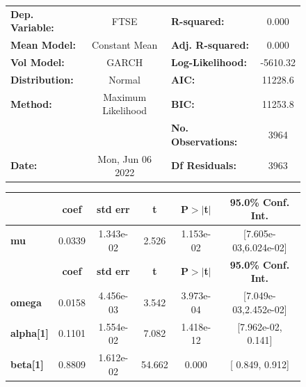 \documentclass[a4paper, oneside]{discothesis}
\begin{document}
\begin{figure}
\begin{multicols}{2}
{  
\begin{center}
\begin{tabular}{lclc}
\toprule
\textbf{Dep. Variable:} &        FTSE        & \textbf{  R-squared:         } &     0.000   \\
\textbf{Mean Model:}    &   Constant Mean    & \textbf{  Adj. R-squared:    } &     0.000   \\
\textbf{Vol Model:}     &       GARCH        & \textbf{  Log-Likelihood:    } &   -5610.32  \\
\textbf{Distribution:}  &       Normal       & \textbf{  AIC:               } &    11228.6  \\
\textbf{Method:}        & Maximum Likelihood & \textbf{  BIC:               } &    11253.8  \\
\textbf{}               &                    & \textbf{  No. Observations:  } &    3964     \\
\textbf{Date:}          &  Mon, Jun 06 2022  & \textbf{  Df Residuals:      } &    3963     \\
\bottomrule
\end{tabular}
\begin{tabular}{lccccc}
            & \textbf{coef} & \textbf{std err} & \textbf{t} & \textbf{P$> |$t$|$} & \textbf{95.0\% Conf. Int.}  \\
\midrule
\textbf{mu} &       0.0339  &    1.343e-02     &     2.526  &      1.153e-02       &   [7.605e-03,6.024e-02]     \\
                  & \textbf{coef} & \textbf{std err} & \textbf{t} & \textbf{P$> |$t$|$} & \textbf{95.0\% Conf. Int.}  \\
\midrule
\textbf{omega}    &       0.0158  &    4.456e-03     &     3.542  &      3.973e-04       &   [7.049e-03,2.452e-02]     \\
\textbf{alpha[1]} &       0.1101  &    1.554e-02     &     7.082  &      1.418e-12       &    [7.962e-02,  0.141]      \\
\textbf{beta[1]}  &       0.8809  &    1.612e-02     &    54.662  &        0.000         &     [  0.849,  0.912]       \\
\bottomrule
\end{tabular}
\end{center}

}
\end{multicols}
\end{figure}
\end{document}
